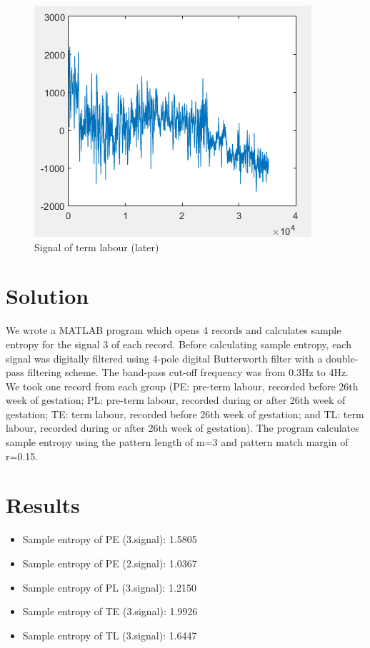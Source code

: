 \documentclass[a4paper,10pt]{article}
\begin{document}
\begin{figure}[H]
\includegraphics{f4}
\caption{Signal of term labour (later)}
\end{figure}

\section {Solution}
We wrote a MATLAB program which opens 4 records and calculates sample entropy for the signal 3 of each record. Before calculating sample entropy, each signal was digitally filtered using 4-pole digital Butterworth filter with a double-pass filtering scheme. The band-pass cut-off frequency was from 0.3Hz to 4Hz.
We took one record from each group  (PE: pre-term  labour, recorded before 26th week of gestation; PL: pre-term labour, recorded during or after 26th week of gestation; TE: term labour, recorded before 26th week of gestation; and TL: term labour, recorded during or after 26th week of gestation). 
The program calculates sample entropy using the pattern length of m=3 and pattern match margin of r=0.15. 


\section {Results}

\begin{itemize}
\item{Sample entropy of PE (3.signal): 1.5805}
\item{Sample entropy of PE (2.signal): 1.0367}
\item{Sample entropy of PL (3.signal): 1.2150}
\item{Sample entropy of TE (3.signal): 1.9926}
\item{Sample entropy of TL (3.signal): 1.6447}
\end{itemize}
\end{document}
